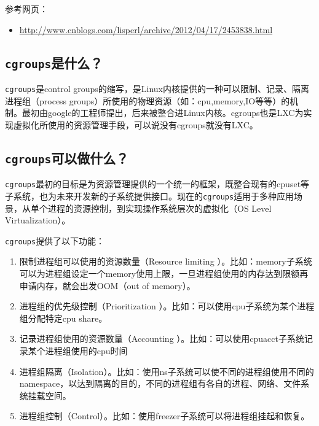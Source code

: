 \documentclass[doctor,openright,twoside]{sjtuthesis}
\providecommand{\tightlist}{%
    \setlength{\itemsep}{0pt}\setlength{\parskip}{0pt}}
\newcommand{\passthrough}[1]{#1}
\theoremstyle{plain}
\theoremstyle{definition}
\theoremstyle{remark}
\theoremstyle{ocrenumbox}
\theoremstyle{plain}
\begin{document}
参考网页：

\begin{itemize}
\tightlist
\item
  \url{http://www.cnblogs.com/lisperl/archive/2012/04/17/2453838.html}
\end{itemize}

\hypertarget{cgroups-1}{%
\subsection{\texorpdfstring{\texttt{cgroups}是什么？}{cgroups是什么？}}\label{cgroups-1}}

\passthrough{\lstinline!cgroups!}是control groups的缩写，是Linux内核提供的一种可以限制、记录、隔离进程组（process groups）所使用的物理资源（如：cpu,memory,IO等等）的机制。最初由google的工程师提出，后来被整合进Linux内核。cgroups也是LXC为实现虚拟化所使用的资源管理手段，可以说没有cgroups就没有LXC。

\hypertarget{cgroups-2}{%
\subsection{\texorpdfstring{\texttt{cgroups}可以做什么？}{cgroups可以做什么？}}\label{cgroups-2}}

\passthrough{\lstinline!cgroups!}最初的目标是为资源管理提供的一个统一的框架，既整合现有的cpuset等子系统，也为未来开发新的子系统提供接口。现在的\passthrough{\lstinline!cgroups!}适用于多种应用场景，从单个进程的资源控制，到实现操作系统层次的虚拟化（OS Level Virtualization）。

\passthrough{\lstinline!cgroups!}提供了以下功能：

\begin{enumerate}
\def\labelenumi{\arabic{enumi}.}
\tightlist
\item
  限制进程组可以使用的资源数量（Resource limiting ）。比如：memory子系统可以为进程组设定一个memory使用上限，一旦进程组使用的内存达到限额再申请内存，就会出发OOM（out of memory）。
\item
  进程组的优先级控制（Prioritization ）。比如：可以使用cpu子系统为某个进程组分配特定cpu share。
\item
  记录进程组使用的资源数量（Accounting ）。比如：可以使用cpuacct子系统记录某个进程组使用的cpu时间
\item
  进程组隔离（Isolation）。比如：使用ns子系统可以使不同的进程组使用不同的namespace，以达到隔离的目的，不同的进程组有各自的进程、网络、文件系统挂载空间。
\item
  进程组控制（Control）。比如：使用freezer子系统可以将进程组挂起和恢复。
\end{enumerate}
\end{document}

